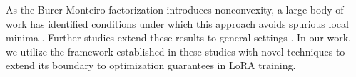 As the Burer-Monteiro factorization introduces nonconvexity, a large body of work has identified conditions under which this approach avoids spurious local minima \cite{NIPS2016_b139e104,10.5555/3305381.3305509,pmlr-v54-park17a,zhang2021sharpglobalguaranteesnonconvex}. Further studies extend these results to general settings \cite{doi:10.1137/18M1231675,zhang2024improved}. In our work, we utilize the framework established in these studies with novel techniques to extend its boundary to optimization guarantees in LoRA training.